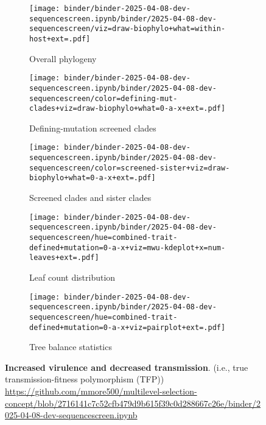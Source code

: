 \begin{figure*}[htbp]
  \centering
  \begin{subfigure}{0.32\textwidth}
    \centering
    \texttt{[image: binder/binder-2025-04-08-dev-sequencescreen.ipynb/binder/2025-04-08-dev-sequencescreen/viz=draw-biophylo+what=within-host+ext=.pdf]}
    \caption{Overall phylogeny}
    \label{fig:dev-sequencescreen:overall_phylogeny}
  \end{subfigure}
  \hfill
  \begin{subfigure}{0.32\textwidth}
    \centering
    \texttt{[image: binder/binder-2025-04-08-dev-sequencescreen.ipynb/binder/2025-04-08-dev-sequencescreen/color=defining-mut-clades+viz=draw-biophylo+what=0-a-x+ext=.pdf]}
    \caption{Defining-mutation screened clades}
    \label{fig:dev-sequencescreen:defining_mut_clades}
  \end{subfigure}
  \hfill
  \begin{subfigure}{0.32\textwidth}
    \centering
    \texttt{[image: binder/binder-2025-04-08-dev-sequencescreen.ipynb/binder/2025-04-08-dev-sequencescreen/color=screened-sister+viz=draw-biophylo+what=0-a-x+ext=.pdf]}
    \caption{Screened clades and sister clades}
    \label{fig:dev-sequencescreen:screened_sister}
  \end{subfigure}

  \vspace{0.5cm} %

  \begin{subfigure}{0.54\textwidth}
    \centering
    \texttt{[image: binder/binder-2025-04-08-dev-sequencescreen.ipynb/binder/2025-04-08-dev-sequencescreen/hue=combined-trait-defined+mutation=0-a-x+viz=mwu-kdeplot+x=num-leaves+ext=.pdf]}
    \caption{Leaf count distribution}
    \label{fig:dev-sequencescreen:leaf_count}
  \end{subfigure}
  \hfill
  \begin{subfigure}{0.44\textwidth}
    \centering
    \texttt{[image: binder/binder-2025-04-08-dev-sequencescreen.ipynb/binder/2025-04-08-dev-sequencescreen/hue=combined-trait-defined+mutation=0-a-x+viz=pairplot+ext=.pdf]}
    \caption{Tree balance statistics}
    \label{fig:dev-sequencescreen:tree_balance}
  \end{subfigure}

  \caption{\textbf{Increased virulence and decreased transmission}. (i.e., true transmission-fitness polymorphism (TFP)) \url{https://github.com/mmore500/multilevel-selection-concept/blob/2716141c7c52cfb479d9b615f39c0d288667c26e/binder/2025-04-08-dev-sequencescreen.ipynb}}
  \label{fig:dev-sequencescreen}
\end{figure*}
